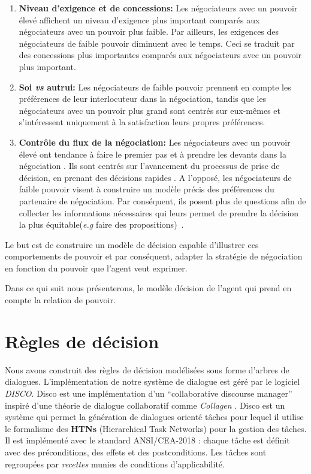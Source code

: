 	\begin{enumerate}
	\item \textbf{Niveau d'exigence et de concessions:} Les négociateurs avec un pouvoir élevé affichent un niveau d'exigence plus important comparés aux négociateurs avec un pouvoir plus faible. Par ailleurs, les exigences des négociateurs de faible pouvoir diminuent avec le temps. Ceci se traduit par des concessions plus importantes comparés aux négociateurs avec un pouvoir plus important. \cite{de1995impact}
	
	\item \textbf{Soi \emph{vs} autrui:} Les négociateurs de faible pouvoir prennent en compte les préférences de leur interlocuteur dans la négociation, tandis que les négociateurs avec un pouvoir plus grand sont  centrés sur eux-mêmes et s'intéressent uniquement à la satisfaction leurs propres préférences. \cite{fiske1993controlling,de1995impact}
	
	\item \textbf{Contrôle du flux de la négociation:}
	Les négociateurs avec un pouvoir élevé ont tendance à faire le premier pas et à prendre les devants dans la négociation \cite {magee2007power}. Ils sont centrés sur l'avancement du processus de prise de décision, en prenant des décisions rapides \cite{zablotskaya2012relating}.
	  A l'opposé, les négociateurs de faible pouvoir visent à construire un modèle précis des préférences du partenaire de négociation. 
	  Par conséquent,  ils posent plus de questions afin de collecter les informations nécessaires qui leurs permet de prendre la décision la plus équitable(\emph{e.g}  faire des propositions)~\cite{de2004influence}. 
	
\end{enumerate}


Le but est de construire un modèle de décision capable d'illustrer ces comportements de pouvoir et par conséquent, adapter la stratégie de négociation en fonction du pouvoir que l'agent veut exprimer.

Dans ce qui suit nous présenterons, le modèle décision de l'agent qui prend en compte la relation de pouvoir.

 
\section{Règles de décision}
	Nous avons construit des règles de décision modélisées sous forme d'arbres de dialogues. L'implémentation de notre système de dialogue est géré par le logiciel \emph{DISCO}. Disco est une implémentation d'un ``collaborative discourse manager'' inspiré d'une théorie de dialogue collaboratif comme \emph{Collagen} \cite{rich1997collagen}. Disco est un système qui permet la génération de dialogues orienté tâches pour lequel il utilise le formalisme des \textbf{HTNs} (Hierarchical Task Networks) \cite{erol1994htn} pour la gestion des tâches. Il est implémenté avec le standard ANSI/CEA-2018 : chaque tâche est définit avec des préconditions, des effets et des postconditions. Les tâches sont regroupées par \emph{recettes} munies de conditions d'applicabilité.
	
